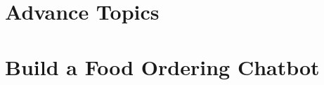 % 

% 

% 
% 

% 
% 

% 
% 



% 

% 

\section[Adv]{Advance Topics}


\section[Exercise]{Build a Food Ordering Chatbot}


% 
% 
